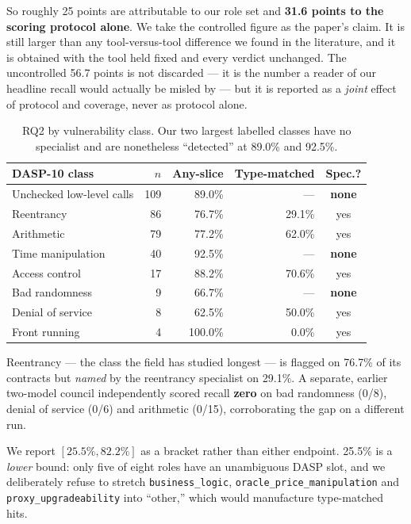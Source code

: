 \documentclass[sigconf,nonacm]{acmart}
\begin{document}
So roughly 25 points are attributable to our role set and \textbf{31.6 points to
the scoring protocol alone}. We take the controlled figure as the paper's claim.
It is still larger than any tool-versus-tool difference we found in the
literature, and it is obtained with the tool held fixed and every verdict
unchanged. The uncontrolled 56.7 points is not discarded --- it is the number a
reader of our headline recall would actually be misled by --- but it is reported
as a \emph{joint} effect of protocol and coverage, never as protocol alone.

\begin{table}[t]
\centering
\caption{RQ2 by vulnerability class. Our two largest labelled classes have no
specialist and are nonetheless ``detected'' at 89.0\% and 92.5\%.}
\label{tab:rq2class}
\small
\begin{tabular}{@{}lrrrc@{}}
\toprule
\textbf{DASP-10 class} & \textbf{$n$} & \textbf{Any-slice} &
\textbf{Type-matched} & \textbf{Spec.?} \\
\midrule
Unchecked low-level calls & 109 & 89.0\% & --- & \textbf{none} \\
Reentrancy & 86 & 76.7\% & 29.1\% & yes \\
Arithmetic & 79 & 77.2\% & 62.0\% & yes \\
Time manipulation & 40 & 92.5\% & --- & \textbf{none} \\
Access control & 17 & 88.2\% & 70.6\% & yes \\
Bad randomness & 9 & 66.7\% & --- & \textbf{none} \\
Denial of service & 8 & 62.5\% & 50.0\% & yes \\
Front running & 4 & 100.0\% & 0.0\% & yes \\
\bottomrule
\end{tabular}
\end{table}

Reentrancy --- the class the field has studied longest --- is flagged on 76.7\% of
its contracts but \emph{named} by the reentrancy specialist on 29.1\%. A separate,
earlier two-model council independently scored recall \textbf{zero} on bad
randomness (0/8), denial of service (0/6) and arithmetic (0/15), corroborating the
gap on a different run.

We report $[25.5\%, 82.2\%]$ as a bracket rather than either endpoint. 25.5\% is a
\emph{lower} bound: only five of eight roles have an unambiguous DASP slot, and we
deliberately refuse to stretch \texttt{business\_logic},
\texttt{oracle\_price\_manipulation} and \texttt{proxy\_upgradeability} into
``other,'' which would manufacture type-matched hits.
\end{document}
